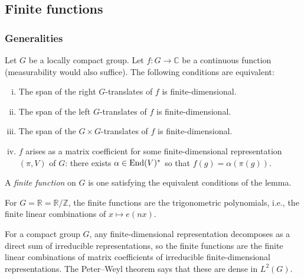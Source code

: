 \documentclass[reqno]{amsart} 
\begin{document}
\subsection{Finite functions}

\subsubsection{Generalities}


\begin{lemma}
  Let $G$ be a locally compact group.  Let $f : G \rightarrow \mathbb{C}$ be a continuous function (measurability would also suffice).  The following conditions are equivalent:
  \begin{enumerate}
    [(i)]
  \item The span of the right $G$-translates of $f$ is finite-dimensional.
  \item The span of the left $G$-translates of $f$ is finite-dimensional.
  \item The span of the $G \times G$-translates of $f$ is finite-dimensional.
  \item $f$ arises as a matrix coefficient for some finite-dimensional representation $(\pi,V)$ of $G$: there exists $\alpha \in \operatorname{End}(V)^*$ so that $f(g) = \alpha(\pi(g))$.
  \end{enumerate}
\end{lemma}
\begin{definition}
  A \emph{finite function} on $G$ is one satisfying the equivalent conditions of the lemma.
\end{definition}

\begin{example}
  For $G = \mathbb{R} = \mathbb{R} / \mathbb{Z}$, the finite functions are the trigonometric polynomials, i.e., the finite linear combinations of $x \mapsto e(n x)$.
\end{example}

\begin{example}
  For a compact group $G$, any finite-dimensional representation decomposes as a direct sum of irreducible representations, so the finite functions are the finite linear combinations of matrix coefficients of irreducible finite-dimensional representations.  The Peter--Weyl theorem says that these are dense in $L^2(G)$.
\end{example}
\end{document}
